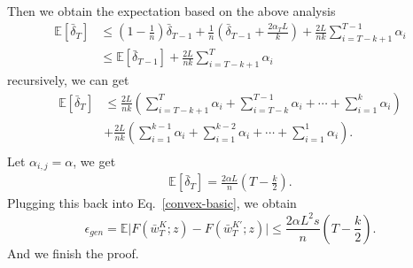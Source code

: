 Then we obtain the expectation based on the above analysis 
  \begin{equation}
  \begin{aligned}
    \mathbb{E}\left[\bar{\delta}_{T}\right] &\leq (1-\frac{1}{n})\bar{\delta}_{T-1} + \frac{1}{n}\left(\bar{\delta}_{T-1}+\frac{2\alpha_T L}{k}\right) + \frac{2L}{nk}\sum_{i=T-k+1}^{T-1}\alpha_i\\
    &\leq \mathbb{E}\left[\bar{\delta}_{T-1}\right] + \frac{2L}{nk}\sum_{i=T-k+1}^{T}\alpha_i
  \end{aligned}
 \end{equation}
recursively, we can get 
    \begin{equation}
     \begin{aligned}
      \mathbb{E}\left[\bar{\delta}_{T}\right]&\leq \frac{2L}{nk} \left( \sum_{i=T-k+1}^{T}\alpha_i + \sum_{i=T-k}^{T-1}\alpha_i + \cdots + \sum_{i=1}^{k}\alpha_i \right) \\ & + \frac{2L}{nk} \left( \sum_{i=1}^{k-1}\alpha_i + \sum_{i=1}^{k-2}\alpha_i + \cdots + \sum_{i=1}^{1}\alpha_i \right). \\
     \end{aligned}
    \end{equation}
Let $\alpha_{i,j}=\alpha$, we get
    \begin{equation}
     \begin{aligned}
      \mathbb{E}\left[\bar{\delta}_{T}\right] = \frac{2\alpha L}{n} \left( T - \frac{k}{2} \right).
     \end{aligned}
    \end{equation}
Plugging this back into Eq.~\eqref{convex-basic}, we obtain
 \begin{equation}\label{eq:2.2.1}
  \epsilon_{gen} = \mathbb{E}\vert F(\bar{w}_T^K;z)-F(\bar{w}^{K\prime}_T;z)\vert \leq \frac{2\alpha L^2 s}{n} \left( T - \frac{k}{2} \right).
 \end{equation}
And we finish the proof.

